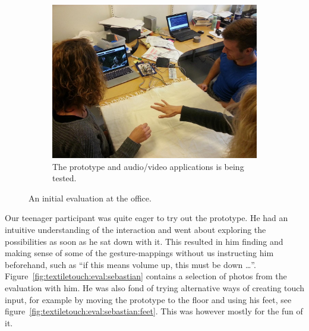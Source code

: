 \begin{figure}[t]
        \begin{subfigure}[b]{0.9\textwidth}
                \centering
                \includegraphics[width=\textwidth]{figures/touch/evaluation/kaia-gitte-troels/kaia-gitte}
                \caption{The prototype and audio/video applications is being tested.}
                \label{fig:textiletouch:eval:kaia-gitte-troels:kaia-gitte}
        \end{subfigure}
        \caption{An initial evaluation at the office.}
        \label{fig:textiletouch:eval:kaia-gitte-troels}
\end{figure}

Our teenager participant was quite eager to try out the prototype.
He had an intuitive understanding of the interaction and went about exploring the possibilities as soon as he sat down with it.
This resulted in him finding and making sense of some of the gesture-mappings without us instructing him beforehand, such as ``if this means volume up, this must be down \dots''.
Figure~\ref{fig:textiletouch:eval:sebastian} contains a selection of photos from the evaluation with him.
He was also fond of trying alternative ways of creating touch input, for example by moving the prototype to the floor and using his feet, see figure~\ref{fig:textiletouch:eval:sebastian:feet}.
This was however mostly for the fun of it.

